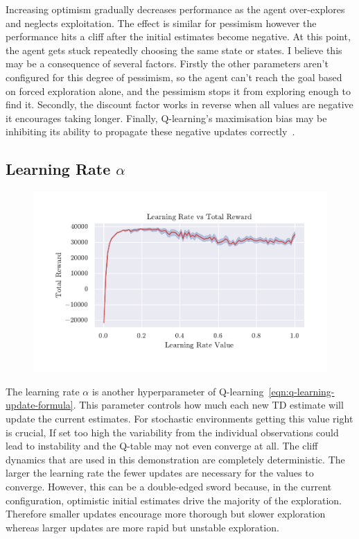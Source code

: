 \documentclass[]{final_report}
\begin{document}
Increasing optimism gradually decreases performance as the agent over-explores and neglects exploitation. The effect is similar for pessimism however the performance hits a cliff after the initial estimates become negative. At this point, the agent gets stuck repeatedly choosing the same state or states. I believe this may be a consequence of several factors. Firstly the other parameters aren't configured for this degree of pessimism, so the agent can't reach the goal based on forced exploration alone, and the pessimism stops it from exploring enough to find it. Secondly, the discount factor works in reverse when all values are negative it encourages taking longer. Finally, Q-learning's maximisation bias may be inhibiting its ability to propagate these negative updates correctly~\cite{doubleQLearning}\cite{sutton2018reinforcement}. 


\subsection{Learning Rate \texorpdfstring{$\alpha$}{Lg}}

\begin{figure}[H]
  \centering
  
  \includegraphics[trim={0 1cm 0 1cm},clip,width=\textwidth]{hyper-paramiters/learning-rate}
  
  \caption{\label{fig:learning-rate}}
\end{figure}

The learning rate $\alpha$ is another hyperparameter of Q-learning~\ref{eqn:q-learning-update-formula}. This parameter controls how much each new TD estimate will update the current estimates. For stochastic environments getting this value right is crucial, If set too high the variability from the individual observations could lead to instability and the Q-table may not even converge at all. The cliff dynamics that are used in this demonstration are completely deterministic. 
The larger the learning rate the fewer updates are necessary for the values to converge. However, this can be a double-edged sword because, in the current configuration, optimistic initial estimates drive the majority of the exploration. Therefore smaller updates encourage more thorough but slower exploration whereas larger updates are more rapid but unstable exploration.
\end{document}
